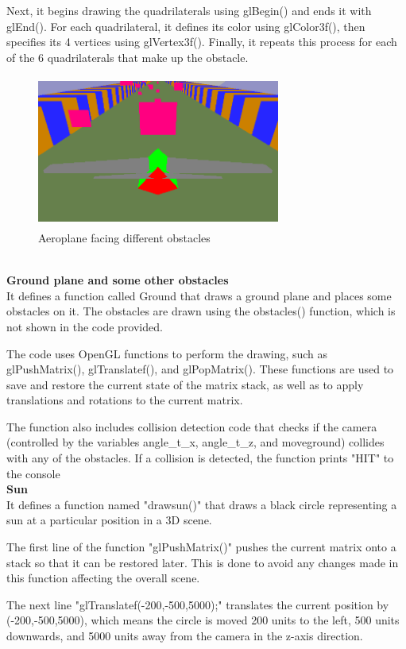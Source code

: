 \documentclass[12pt,a4]{article}
\begin{document}
{Next, it begins drawing the quadrilaterals using glBegin() and ends it with glEnd(). For each quadrilateral, it defines its color using glColor3f(), then specifies its 4 vertices using glVertex3f(). Finally, it repeats this process for each of the 6 quadrilaterals that make up the obstacle.\\
\begin{figure}[h]
    \centering
    \includegraphics[width=8cm, height=5cm]{Screenshot (58).png}
    \caption{Aeroplane facing different obstacles}
    \label{fig:my_label}
\end{figure}\\
\textbf{\Large{Ground plane and some other obstacles}}\\
It defines a function called Ground that draws a ground plane and places some obstacles on it. The obstacles are drawn using the obstacles() function, which is not shown in the code provided.

The code uses OpenGL functions to perform the drawing, such as glPushMatrix(), glTranslatef(), and glPopMatrix(). These functions are used to save and restore the current state of the matrix stack, as well as to apply translations and rotations to the current matrix.

The function also includes collision detection code that checks if the camera (controlled by the variables angle\_t\_x, angle\_t\_z, and moveground) collides with any of the obstacles. If a collision is detected, the function prints "HIT" to the console
\\
\textbf{\Large{Sun}}\\
It defines a function named "drawsun()" that draws a black circle representing a sun at a particular position in a 3D scene.

The first line of the function "glPushMatrix()" pushes the current matrix onto a stack so that it can be restored later. This is done to avoid any changes made in this function affecting the overall scene.

The next line "glTranslatef(-200,-500,5000);" translates the current position by (-200,-500,5000), which means the circle is moved 200 units to the left, 500 units downwards, and 5000 units away from the camera in the z-axis direction.

}
\end{document}
